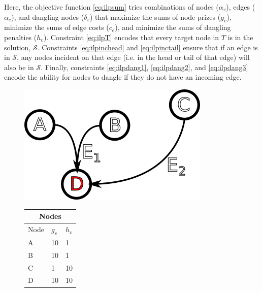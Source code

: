 \documentclass[12pt,twoside]{reedthesis}
\theoremstyle{definition}
\begin{document}
Here, the objective function \eqref{eq:ilpsum} tries combinations of nodes ($\alpha_v$), edges ($\alpha_e$), and dangling nodes ($\delta_v$) that maximize the sums of node prizes ($g_v$), minimize the sums of edge costs ($c_e$), and minimize the sums of dangling penalties ($h_v$). Constraint \eqref{eq:ilpT} encodes that every target node in $T$ is in the solution, $\mathcal{S}$.  Constraints \eqref{eq:ilpinchead} and \eqref{eq:ilpinctail} ensure that if an edge is in $\mathcal{S}$, any nodes incident on that edge (i.e. in the head or tail of that edge) will also be in $\mathcal{S}$.  Finally, constraints \eqref{eq:ilpdang1}, \eqref{eq:ilpdang2}, and \eqref{eq:ilpdang3} encode the ability for nodes to dangle if they do not have an incoming edge.\par

\begin{figure}[!htbp]
  \begin{minipage}[b]{0.60\linewidth}
    \centering
    \includegraphics{dummy-before}
    \par\vspace{0pt}
  \end{minipage}%
  \begin{minipage}[b]{0.30\linewidth}
    \centering%
    \begin{tabular}{ |l|l|l| }%
      \hline%
      \multicolumn{3}{|c|}{Nodes} \\%
      \hline \hline
      Node & $g_v$ &  $h_v$ \\ \hline%
      A & 10 &  1\\ \hline%
      B & 10 &  1\\ \hline%
      C & 1 &  10\\ \hline%
      D & 10 &  10\\ \hline%
    \end{tabular}%
    \par\vspace{0pt}
  \end{minipage}

\end{figure}
\end{document}
